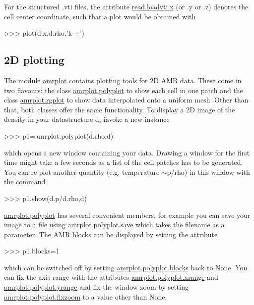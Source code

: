 For the structured {\ttfamily .vti} files, the attribute \hyperlink{classread_1_1loadvti_ad8a6fdb88386dce051cdade16bf426a1}{read.\+loadvti.\+x} (or .y or .z) denotes the cell center coordinate, such that a plot would be obtained with 
\begin{DoxyCode}
>>> plot(d.x,d.rho,'k-+')
\end{DoxyCode}
\hypertarget{index_twodplots}{}\subsection{2\+D plotting}\label{index_twodplots}
The module \hyperlink{namespaceamrplot}{amrplot} contains plotting tools for 2D A\+MR data. These come in two flavours\+: the class \hyperlink{classamrplot_1_1polyplot}{amrplot.\+polyplot} to show each cell in one patch and the class \hyperlink{classamrplot_1_1rgplot}{amrplot.\+rgplot} to show data interpolated onto a uniform mesh. Other than that, both classes offer the same functionality. To display a 2D image of the density in your datastructure {\ttfamily d}, invoke a new instance 
\begin{DoxyCode}
>>> p1=amrplot.polyplot(d.rho,d)
\end{DoxyCode}
 which opens a new window containing your data. Drawing a window for the first time might take a few seconds as a list of the cell patches has to be generated. You can re-\/plot another quantity (e.\+g. temperature $\sim$p/rho) in this window with the command 
\begin{DoxyCode}
>>> p1.show(d.p/d.rho,d)
\end{DoxyCode}
 \hyperlink{classamrplot_1_1polyplot}{amrplot.\+polyplot} has several convenient members, for example you can save your image to a file using \hyperlink{classamrplot_1_1polyplot_a7e289ef0020a669b88ce755f8efb1b55}{amrplot.\+polyplot.\+save} which takes the filename as a parameter. The A\+MR blocks can be displayed by setting the attribute 
\begin{DoxyCode}
>>> p1.blocks=1
\end{DoxyCode}
 which can be switched off by setting \hyperlink{classamrplot_1_1polyplot_a81c5cd47348d2861c881942d2999d193}{amrplot.\+polyplot.\+blocks} back to {\ttfamily None}. You can fix the axis-\/range with the attributes \hyperlink{classamrplot_1_1polyplot_ab2e85991ae46edf094b98591597e6f87}{amrplot.\+polyplot.\+xrange} and \hyperlink{classamrplot_1_1polyplot_ac8b059832edba2155f81adde51acecd5}{amrplot.\+polyplot.\+yrange} and fix the window zoom by setting \hyperlink{classamrplot_1_1polyplot_aa4653b545c07e2a4ed7f0f61bf45e85f}{amrplot.\+polyplot.\+fixzoom} to a value other than {\ttfamily None}.

